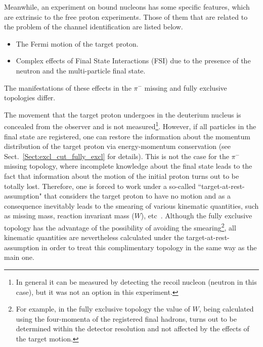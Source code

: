 Meanwhile, an experiment on bound nucleons has some specific features, which are extrinsic to the free proton experiments. Those of them that are related to the problem of the channel identification are listed below.%

\begin{itemize}
\item  The Fermi motion of the target proton.%
\item Complex effects of Final State Interactions (FSI) due to the presence of the neutron and the multi-particle final state.
\end{itemize}%

The manifestations of these effects in the $\pi^{-}$ missing and fully exclusive topologies differ.

The movement that the target proton undergoes in the deuterium nucleus is concealed from the observer and is not measured\footnote[10]{In general it can be measured by detecting the recoil nucleon (neutron in this case), but it was not an option in this experiment.}. However, if all particles in the final state are registered, one can restore the information about the momentum distribution of the target proton via energy-momentum conservation (see Sect.~\ref{Sect:excl_cut_fully_excl} for details). This is not the case for the $\pi^{-}$ missing topology, where incomplete knowledge about the final state leads to the fact that information about the motion of the initial proton turns out to be totally lost. Therefore, one is forced to work under a so-called ``target-at-rest-assumption" that considers the target proton to have no motion and as a consequence inevitably leads to the smearing of various kinematic quantities, such as missing mass, reaction invariant mass ($W$), etc~\cite{Skorodumina:2015rea}. 
Although the fully exclusive topology has the advantage of the possibility of avoiding the smearing\footnote[11]{For example, in the fully exclusive topology the value of $W$, being calculated using the four-momenta of the registered final hadrons, turns out to be determined within the detector resolution and not affected by the effects of the target motion.}, all kinematic quantities are nevertheless calculated under the target-at-rest-assumption in order to treat this complimentary topology in the same way as the main one.


